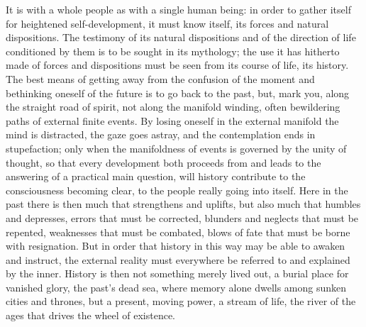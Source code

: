 \documentclass[12pt,a4paper,openany]{book}
\newcommand{\opage}[1]{\marginnote{\footnotesize\textit{[#1]}}}
\begin{document}
It is with a whole people as with a single
human being: in order to gather itself for heightened self-development,
it must know itself, its forces and natural dispositions.
The testimony of its natural dispositions and of the direction of life
conditioned by them is to be sought in its mythology; the use
it has hitherto made of forces and dispositions must be seen
from its course of life, its history. The best means of
getting away from the confusion of the moment and bethinking oneself of
the future is to go back to the past, but, mark you,
along the straight road of spirit, not along the manifold winding, often
bewildering paths of external finite events.
By losing oneself in the external manifold the mind is distracted,
the gaze goes astray, and the contemplation ends in
stupefaction; only when the manifoldness of events is governed
by the unity of thought, so that every development
both proceeds from and leads to the answering of a practical
main question, will history contribute to the consciousness
becoming clear, to the people really going into itself.
Here in the past there is then much that strengthens and uplifts,
but also much that humbles and depresses, errors that
must be corrected, blunders and neglects that must be repented,
weaknesses that must be combated, blows of fate that
must be borne with resignation. But in order that history in
this way may be able to awaken and instruct,
the external reality must everywhere be referred to and explained
by the inner. History is then not something merely
lived out, a burial place for vanished glory, the
\setcounter{footnote}{0}%
\opage{433}past's dead sea, where memory alone dwells among
sunken cities and thrones, but a present,
moving power, a stream of life, the river of the ages
that drives the wheel of existence.
\end{document}
